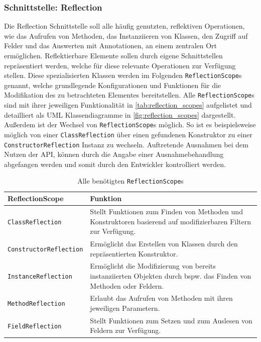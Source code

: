 \subsubsection{Schnittstelle: Reflection}
Die Reflection Schnittstelle soll alle häufig genutzten, reflektiven Operationen, wie das Aufrufen von Methoden, das Instanziieren von Klassen, den Zugriff auf Felder und das Auswerten mit Annotationen, an einem zentralen Ort ermöglichen. Reflektierbare Elemente sollen durch eigene Schnittstellen repräsentiert werden, welche für diese relevante Operationen zur Verfügung stellen. Diese spezialisierten Klassen werden im Folgenden \texttt{ReflectionScope}s genannt, welche grundlegende Konfigurationen und Funktionen für die Modifikation des zu betrachteten Elementes bereitstellen. Alle \texttt{ReflectionScope}s sind mit ihrer jeweiligen Funktionalität in \autoref{tab:reflection_scopes} aufgelistet und detailliert als UML Klassendiagramme in \autoref{fig:reflection_scopes} dargestellt. Außerdem ist der Wechsel von \texttt{ReflectionScope}s möglich. So ist es beispielsweise möglich von einer \texttt{ClassReflection} über einen gefundenen Konstruktor zu einer \texttt{ConstructorReflection} Instanz zu wechseln. Auftretende Ausnahmen bei dem Nutzen der API, können durch die Angabe einer Ausnahmebehandlung abgefangen werden und somit durch den Entwickler kontrolliert werden.
\begin{table}[H]
	\centering
	\renewcommand*{\arraystretch}{1.3}
	\begin{tabular}{|p{}|p{}|}
		\hline
		ReflectionScope & Funktion\\
		\hline
		\texttt{ClassReflection} & Stellt Funktionen zum Finden von Methoden und Konstruktoren basierend auf modifizierbaren Filtern zur Verfügung.\\
		\hline
		\texttt{ConstructorReflection} & Ermöglicht das Erstellen von Klassen durch den repräsentierten Konstruktor.\\
		\hline
		\texttt{InstanceReflection} & Ermöglicht die Modifizierung von bereits instanziierten Objekten durch bspw. das Finden von Methoden oder Feldern.\\
		\hline
		\texttt{MethodReflection} & Erlaubt das Aufrufen von Methoden mit ihren jeweiligen Parametern.\\
		\hline
		\texttt{FieldReflection} & Stellt Funktionen zum Setzen und zum Auslesen von Feldern zur Verfügung.\\
		\hline
	\end{tabular}
	\caption{Alle benötigten \texttt{ReflectionScope}s}
	\label{tab:reflection_scopes}
\end{table}
